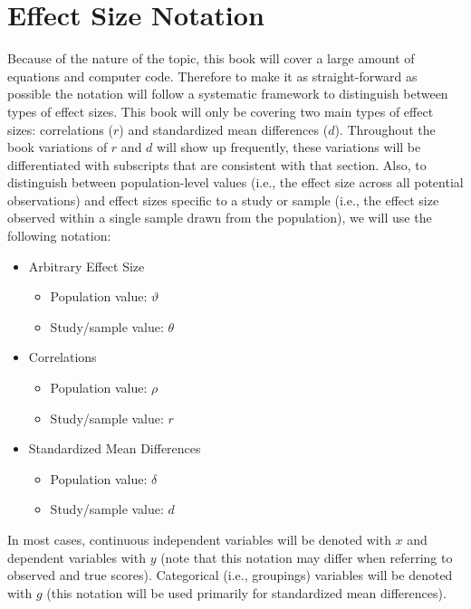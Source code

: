 \documentclass[
  letterpaper,
  DIV=11,
  numbers=noendperiod]{scrreprt}
\providecommand{\tightlist}{%
  \setlength{\itemsep}{0pt}\setlength{\parskip}{0pt}}\usepackage{longtable,booktabs,array}
\begin{document}
\hypertarget{effect-size-notation}{%
\section{Effect Size Notation}\label{effect-size-notation}}

Because of the nature of the topic, this book will cover a large amount
of equations and computer code. Therefore to make it as straight-forward
as possible the notation will follow a systematic framework to
distinguish between types of effect sizes. This book will only be
covering two main types of effect sizes: correlations (\(r\)) and
standardized mean differences (\(d\)). Throughout the book variations of
\(r\) and \(d\) will show up frequently, these variations will be
differentiated with subscripts that are consistent with that section.
Also, to distinguish between population-level values (i.e., the effect
size across all potential observations) and effect sizes specific to a
study or sample (i.e., the effect size observed within a single sample
drawn from the population), we will use the following notation:

\begin{itemize}
\tightlist
\item
  Arbitrary Effect Size

  \begin{itemize}
  \tightlist
  \item
    Population value: \(\vartheta\)
  \item
    Study/sample value: \(\theta\)
  \end{itemize}
\item
  Correlations

  \begin{itemize}
  \tightlist
  \item
    Population value: \(\rho\)
  \item
    Study/sample value: \(r\)
  \end{itemize}
\item
  Standardized Mean Differences

  \begin{itemize}
  \tightlist
  \item
    Population value: \(\delta\)
  \item
    Study/sample value: \(d\)
  \end{itemize}
\end{itemize}

In most cases, continuous independent variables will be denoted with
\(x\) and dependent variables with \(y\) (note that this notation may
differ when referring to observed and true scores). Categorical (i.e.,
groupings) variables will be denoted with \(g\) (this notation will be
used primarily for standardized mean differences).
\end{document}

